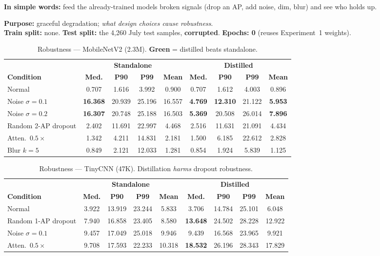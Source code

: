 \documentclass[11pt]{article}
\newcommand{\best}[1]{\textbf{\textcolor{green!50!black}{#1}}}
\newcommand{\worst}[1]{\textbf{\textcolor{red!70!black}{#1}}}
\begin{document}
\textbf{In simple words:} feed the already-trained models broken signals (drop an AP, add noise, dim,
blur) and see who holds up.

\textbf{Purpose:} graceful degradation; \emph{what design choices cause robustness}.\\
\textbf{Train split:} none. \quad \textbf{Test split:} the 4{,}260 July test samples, \textbf{corrupted}.
\quad \textbf{Epochs: 0} (reuses Experiment~1 weights).

\begin{table}[h]\centering\footnotesize
\caption{Robustness --- MobileNetV2 (2.3M). \best{Green} = distilled beats standalone.}
\begin{tabular}{@{}lcccc|cccc@{}}
\toprule
 & \multicolumn{4}{c|}{\textbf{Standalone}} & \multicolumn{4}{c}{\textbf{Distilled}} \\
\textbf{Condition} & \textbf{Med.} & \textbf{P90} & \textbf{P99} & \textbf{Mean} & \textbf{Med.} & \textbf{P90} & \textbf{P99} & \textbf{Mean} \\
\midrule
Normal               & 0.707 & 1.616 & 3.992 & 0.900 & 0.707 & 1.612 & 4.003 & 0.896 \\
Noise $\sigma{=}0.1$ & \worst{16.368}& 20.939& 25.196& 16.557& \best{4.769}& \best{12.310}& 21.122& \best{5.953} \\
Noise $\sigma{=}0.2$ & \worst{16.307}& 20.748& 25.188& 16.503& \best{5.369}& 20.508& 26.014& \best{7.896} \\
Random 2-AP dropout  & 2.402 & 11.691& 22.997& 4.468 & 2.516 & 11.631& 21.091& 4.434 \\
Atten.\ $0.5\times$  & 1.342 & 4.211 & 14.831& 2.181 & 1.500 & 6.185 & 22.612& 2.828 \\
Blur $k{=}5$         & 0.849 & 2.121 & 12.033& 1.281 & 0.854 & 1.924 & 5.839 & 1.125 \\
\bottomrule
\end{tabular}
\end{table}

\begin{table}[h]\centering\footnotesize
\caption{Robustness --- TinyCNN (47K). Distillation \emph{harms} dropout robustness.}
\begin{tabular}{@{}lcccc|cccc@{}}
\toprule
 & \multicolumn{4}{c|}{\textbf{Standalone}} & \multicolumn{4}{c}{\textbf{Distilled}} \\
\textbf{Condition} & \textbf{Med.} & \textbf{P90} & \textbf{P99} & \textbf{Mean} & \textbf{Med.} & \textbf{P90} & \textbf{P99} & \textbf{Mean} \\
\midrule
Normal               & 3.922 & 13.919& 23.244& 5.833 & 3.706 & 14.784& 25.101& 6.048 \\
Random 1-AP dropout  & 7.940 & 16.858& 23.405& 8.580 & \worst{13.648}& 24.502& 28.228& 12.922 \\
Noise $\sigma{=}0.1$ & 9.457 & 17.049& 25.018& 9.946 & 9.439 & 16.568& 23.965& 9.921 \\
Atten.\ $0.5\times$  & 9.708 & 17.593& 22.233& 10.318& \worst{18.532}& 26.196& 28.343& 17.829 \\
\bottomrule
\end{tabular}
\end{table}
\end{document}
